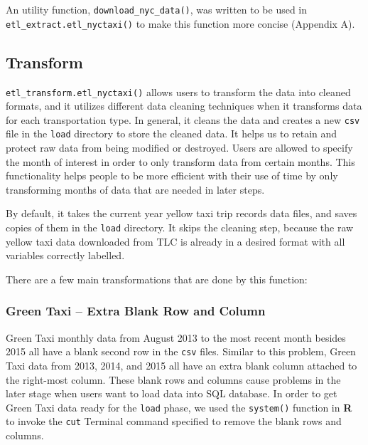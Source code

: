 \documentclass[12pt,twoside]{reedthesis}
\newenvironment{Shaded}{\begin{snugshade}}{\end{snugshade}}
\newcommand{\KeywordTok}[1]{\textcolor[rgb]{0.13,0.29,0.53}{\textbf{#1}}}
\newcommand{\DataTypeTok}[1]{\textcolor[rgb]{0.13,0.29,0.53}{#1}}
\newcommand{\DecValTok}[1]{\textcolor[rgb]{0.00,0.00,0.81}{#1}}
\newcommand{\StringTok}[1]{\textcolor[rgb]{0.31,0.60,0.02}{#1}}
\newcommand{\OperatorTok}[1]{\textcolor[rgb]{0.81,0.36,0.00}{\textbf{#1}}}
\newcommand{\NormalTok}[1]{#1}
\theoremstyle{definition}
\theoremstyle{definition}
\theoremstyle{definition}
\theoremstyle{remark}
\begin{document}
An utility function, \texttt{download\_nyc\_data()}, was written to be
used in \texttt{etl\_extract.etl\_nyctaxi()} to make this function more
concise (Appendix A).

\subsection{Transform}\label{transform}

\texttt{etl\_transform.etl\_nyctaxi()} allows users to transform the
data into cleaned formats, and it utilizes different data cleaning
techniques when it transforms data for each transportation type. In
general, it cleans the data and creates a new \texttt{csv} file in the
\texttt{load} directory to store the cleaned data. It helps us to retain
and protect raw data from being modified or destroyed. Users are allowed
to specify the month of interest in order to only transform data from
certain months. This functionality helps people to be more efficient
with their use of time by only transforming months of data that are
needed in later steps.

By default, it takes the current year yellow taxi trip records data
files, and saves copies of them in the \texttt{load} directory. It skips
the cleaning step, because the raw yellow taxi data downloaded from TLC
is already in a desired format with all variables correctly labelled.
\begin{Shaded}
\end{Shaded}
There are a few main transformations that are done by this function:

\subsubsection{Green Taxi -- Extra Blank Row and
Column}\label{green-taxi-extra-blank-row-and-column}

Green Taxi monthly data from August 2013 to the most recent month
besides 2015 all have a blank second row in the \texttt{csv} files.
Similar to this problem, Green Taxi data from 2013, 2014, and 2015 all
have an extra blank column attached to the right-most column. These
blank rows and columns cause problems in the later stage when users want
to load data into SQL database. In order to get Green Taxi data ready
for the \texttt{load} phase, we used the \texttt{system()} function in
\textbf{R} to invoke the \texttt{cut} Terminal command specified to
remove the blank rows and columns.
\end{document}
